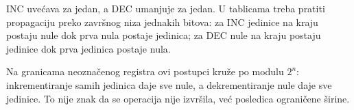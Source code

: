 INC uvećava za jedan, a DEC umanjuje za jedan. U tablicama treba pratiti propagaciju preko završnog niza jednakih bitova: za INC jedinice na kraju postaju nule dok prva nula postaje jedinica; za DEC nule na kraju postaju jedinice dok prva jedinica postaje nula.

Na granicama neoznačenog registra ovi postupci kruže po modulu $2^n$: inkrementiranje samih jedinica daje sve nule, a dekrementiranje nule daje sve jedinice. To nije znak da se operacija nije izvršila, već posledica ograničene širine.

